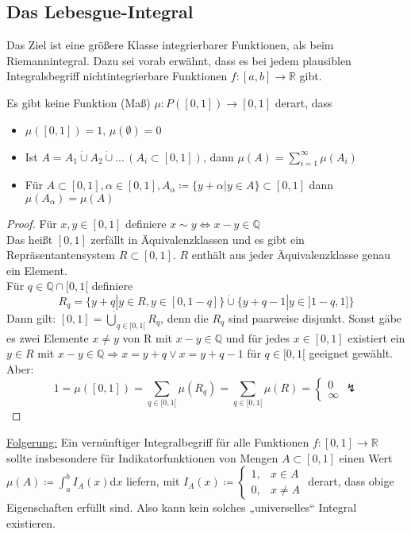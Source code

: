 \subsection{Das Lebesgue-Integral}

Das Ziel ist eine größere Klasse integrierbarer Funktionen, als beim Riemannintegral. Dazu sei vorab erwähnt, dass es bei jedem plausiblen Integralsbegriff nichtintegrierbare Funktionen $f\colon [a,b] \to \mathbb{R}$ gibt.\\
\begin{claim_n} Es gibt keine Funktion (Maß) $\mu\colon P([0,1]) \to [0,1]$ derart, dass
\begin{itemize}
	\item $\mu([0,1]) = 1, \, \mu(\emptyset) = 0$
	\item Ist $A = A_1 \dot{\cup} A_2 \dot{\cup} ... \,(A_i \subset [0,1])$, dann $\mu(A) = \sum_{i=1}^{\infty} \mu(A_i)$
	\item Für $A \subset [0,1], \alpha \in [0,1], A_{\alpha} \coloneqq \{y + \alpha | y \in A\} \subset [0,1]$ dann $\mu(A_{\alpha}) = \mu(A)$
\end{itemize}
\end{claim_n}
\begin{proof} Für $x,y\in [0,1]$ definiere $x \sim y \Leftrightarrow x-y \in \mathbb{Q}$\\
Das heißt $[0,1]$ zerfällt in Äquivalenzklassen und es gibt ein Repräsentantensystem $R \subset [0,1]$. $R$ enthält aus jeder Äquivalenzklasse genau ein Element.\\
Für $q\in \mathbb{Q} \cap [0,1[$ definiere 
\[
	R_q = \{y + q | y \in R, y \in [0,1-q]\} \dot{\cup} \{ y+q-1|y \in ]1-q,1] \}
\]
Dann gilt: $[0,1] = \dot{\bigcup}_{q\in[0,1[} R_q$, denn die $R_q$ sind paarweise disjunkt. Sonst gäbe es zwei Elemente $x\neq y$ von R mit $x-y \in \mathbb{Q}$ und für jedes $x \in [0,1]$ existiert ein $y \in R$ mit $x-y \in \mathbb{Q} \Rightarrow x = y + q \lor x = y + q - 1$ für $q\in [0,1[$ geeignet gewählt.\\
Aber: \[1 = \mu([0,1]) = \sum_{q \in [0,1[} \mu(R_q) = \sum_{q \in [0,1[} \mu(R) =
\left \{
\begin{matrix}
0\\
\infty
\end{matrix}
\right . \lightning\]
\end{proof}
\underline{Folgerung:} Ein vernünftiger Integralbegriff für alle Funktionen $f\colon [0,1] \to \mathbb{R}$ sollte insbesondere für Indikatorfunktionen von Mengen $A \subset [0,1]$ einen Wert $\mu(A)\coloneqq \int_{a}^{b} I_A(x) \text{d}x$ liefern, mit $I_A(x) \coloneqq \left \{ \begin{matrix}
1, & x \in A\\
0, & x \ne A
\end{matrix}
\right .$ derart, dass obige Eigenschaften erfüllt sind. Also kann kein solches „universelles“ Integral existieren.

